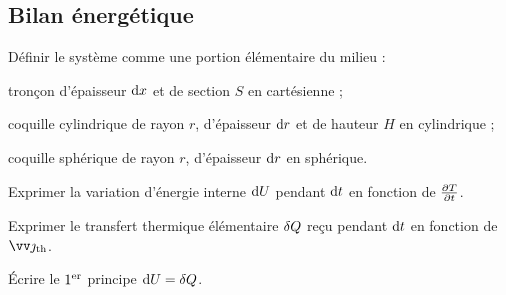 \documentclass[12pt,fancy]{cours}
\begin{document}
\subsection{Bilan énergétique}

\begin{methode}
  \item Définir le système comme une portion élémentaire du milieu :
  \begin{liste}
    \item tronçon d'épaisseur $\mathrm{d} x$ et de section $S$ en cartésienne ;
    \item coquille cylindrique de rayon $r$, d'épaisseur $\mathrm{d} r$ et de hauteur $H$ en cylindrique ;
    \item coquille sphérique de rayon $r$, d'épaisseur $\mathrm{d} r$ en sphérique.
  \end{liste}
  \item Exprimer la variation d'énergie interne $\mathrm{d} U$ pendant $\mathrm{d} t$ en fonction de $\frac{\partial{T}}{\partial{t}}$.
  \item Exprimer le transfert thermique élémentaire $\delta Q$ reçu pendant $\mathrm{d} t$ en fonction de $\Vec{\jth}$.
  \item Écrire le $1^{\rm er}$ principe $\mathrm{d} U = \delta Q$.
\end{methode}
\end{document}
